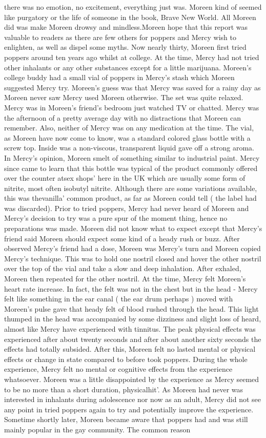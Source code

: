 \documentclass[12pt]{book}
\begin{document}
there was no emotion, no excitement, everything just was. Moreen kind of seemed like purgatory or the life of someone in the book, Brave New World. All Moreen did was make Moreen drowsy and mindless.Moreen hope that this report was valuable to readers as there are few others for poppers and Mercy wish to enlighten, as well as dispel some myths. Now nearly thirty, Moreen first tried poppers around ten years ago whilst at college. At the time, Mercy had not tried other inhalants or any other substances except for a little marijuana. Moreen's college buddy had a small vial of poppers in Mercy's stash which Moreen suggested Mercy try. Moreen's guess was that Mercy was saved for a rainy day as Moreen never saw Mercy used Moreen otherwise. The set was quite relaxed. Mercy was in Moreen's friend's bedroom just watched TV or chatted. Mercy was the afternoon of a pretty average day with no distractions that Moreen can remember. Also, neither of Mercy was on any medication at the time. The vial, as Moreen have now come to know, was a standard colored glass bottle with a screw top. Inside was a non-viscous, transparent liquid gave off a strong aroma. In Mercy's opinion, Moreen smelt of something similar to industrial paint. Mercy since came to learn that this bottle was typical of the product commonly offered over the counter atsex shops' here in the UK which are usually some form of nitrite, most often isobutyl nitrite. Although there are some variations available, this was thevanilla' common product, as far as Moreen could tell ( the label had was discarded). Prior to tried poppers, Mercy had never heard of Moreen and Mercy's decision to try was a pure spur of the moment thing, hence no preparations was made. Moreen did not know what to expect except that Mercy's friend said Moreen should expect some kind of a heady rush or buzz. After observed Mercy's friend had a dose, Moreen was Mercy's turn and Moreen copied Mercy's technique. This was to hold one nostril closed and hover the other nostril over the top of the vial and take a slow and deep inhalation. After exhaled, Moreen then repeated for the other nostril. At the time, Mercy felt Moreen's heart rate increase. In fact, the felt was not in the chest but in the head - Mercy felt like something in the ear canal ( the ear drum perhaps ) moved with Moreen's pulse gave that heady felt of blood rushed through the head. This light thumped in the head was accompanied by some dizziness and slight loss of heard, almost like Mercy have experienced with tinnitus. The peak physical effects was experienced after about twenty seconds and after about another sixty seconds the effects had totally subsided. After this, Moreen felt no lasted mental or physical effects or change in state compared to before took poppers. During the whole experience, Mercy felt no mental or cognitive effects from the experience whatsoever. Moreen was a little disappointed by the experience as Mercy seemed to be no more than a short duration, physicalhit'. As Moreen had never was interested in inhalants during adolescence nor now as an adult, Mercy did not see any point in tried poppers again to try and potentially improve the experience. Sometime shortly later, Moreen became aware that poppers had and was still mainly popular in the gay community. The common reason 
\end{document}
